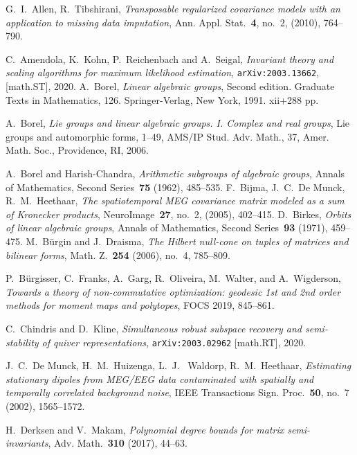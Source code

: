 \documentclass[11pt]{amsart}
\theoremstyle{definition}
\begin{document}
\begin{thebibliography}{99}

 G.~I.~Allen, R.~Tibshirani, {\it Transposable regularized covariance models with an application to missing data imputation}, Ann. Appl. Stat.~{\bf 4}, no.~2, (2010), 764--790.


 C.~Amendola, K.~Kohn, P.~Reichenbach and A.~Seigal, {\it Invariant theory and scaling algorithms for maximum likelihood estimation}, {\tt arXiv:2003.13662}, [math.ST], 2020.
 A.~Borel, {\it Linear algebraic groups}, Second edition. Graduate Texts in Mathematics, 126. Springer-Verlag, New York, 1991. xii+288 pp.

 A.~Borel, {\it Lie groups and linear algebraic groups. I. Complex and real groups}, Lie groups and automorphic forms, 1--49,
AMS/IP Stud. Adv. Math., 37, Amer. Math. Soc., Providence, RI, 2006.

 A.~Borel and Harish-Chandra, {\it Arithmetic subgroups of algebraic groups}, Annals of Mathematics, Second Series~{\bf 75} (1962), 485--535.
 F.~Bijma, J.~C.~De Munck, R.~M.~Heethaar, {\it The spatiotemporal MEG covariance matrix modeled as a sum of Kronecker products}, NeuroImage~{\bf 27}, no.~2, (2005), 402--415.
 D.~Birkes, {\it Orbits of linear algebraic groups}, Annals of Mathematics, Second Series~{\bf 93} (1971), 459--475.
 M.~B\"urgin and J.~Draisma, {\it The Hilbert null-cone on tuples of matrices and bilinear forms}, Math. Z.~{\bf 254} (2006), no.~4, 785--809.

 P.~B\"urgisser, C.~Franks, A.~Garg, R.~Oliveira, M.~Walter, and A.~Wigderson, {\it Towards a theory of non-commutative optimization: geodesic 1st and 2nd order methods for moment maps and polytopes}, FOCS 2019, 845--861.

 C.~Chindris and D.~Kline, {\it Simultaneous robust subspace recovery and semi-stability of quiver representations}, {\tt arXiv:2003.02962} [math.RT], 2020.

 J.~C.~De Munck, H.~M.~Huizenga, L.~J.~ Waldorp, R.~M.~Heethaar, {\it Estimating stationary dipoles from MEG/EEG data contaminated with spatially and
temporally correlated background noise}, IEEE Transactions Sign. Proc.~{\bf 50}, no.~7 (2002), 1565--1572.

 H.~Derksen and V.~Makam, {\it Polynomial degree bounds for matrix semi-invariants},  Adv. Math.~{\bf 310} (2017), 44--63.


\end{thebibliography}
\end{document}
